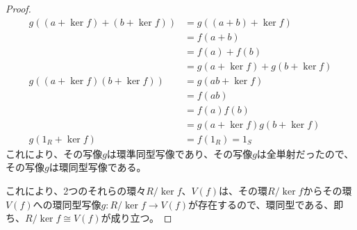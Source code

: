 \documentclass[dvipdfmx]{jsarticle}
\begin{document}
\begin{proof}
\begin{align*}
g\left( \left( a + \ker f \right) + \left( b + \ker f \right) \right) &= g\left( (a + b) + \ker f \right)\\
&= f(a + b)\\
&= f(a) + f(b)\\
&= g\left( a + \ker f \right) + g\left( b + \ker f \right)\\
g\left( \left( a + \ker f \right)\left( b + \ker f \right) \right) &= g\left( ab + \ker f \right)\\
&= f(ab)\\
&= f(a)f(b)\\
&= g\left( a + \ker f \right)g\left( b + \ker f \right)\\
g\left( 1_{R} + \ker f \right) &= f\left( 1_{R} \right) = 1_{S}
\end{align*}
これにより、その写像$g$は環準同型写像であり、その写像$g$は全単射だったので、その写像$g$は環同型写像である。\par
これにより、2つのそれらの環々${R}/{\ker f}$、$V(f)$は、その環${R}/{\ker f}$からその環$V(f)$への環同型写像$g:{R}/{\ker f} \rightarrow V(f)$が存在するので、環同型である、即ち、${R}/{\ker f} \cong V(f)$が成り立つ。
\end{proof}
\end{document}
